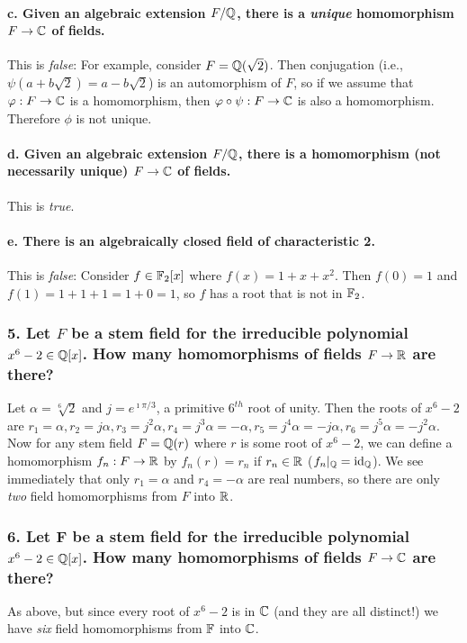 \paragraph*{c. Given an algebraic extension $F/\mathbb{Q}$, there is a \emph{unique} homomorphism $F \to \mathbb{C}$ of fields.}
This is \emph{false}: For example, consider $F = \mathbb{Q}(\sqrt{2})$. Then conjugation (i.e., $\psi(a + b \sqrt{2}) = a - b \sqrt{2}$) is an automorphism of $F$, so if we assume that $\varphi: F \to \mathbb{C}$ is a homomorphism, then $\varphi \circ \psi: F \to \mathbb{C}$ is also a homomorphism. Therefore $\phi$ is not unique.

\paragraph*{d. Given an algebraic extension $F/\mathbb{Q}$, there is a homomorphism (not necessarily unique) $F \to \mathbb{C}$ of fields.}
This is \emph{true}.

\paragraph*{e. There is an algebraically closed field of characteristic 2.}
This is \emph{false}: Consider $f \in \mathbb{F}_2[x]$ where $f(x) = 1 + x + x^2$. Then $f(0) = 1$ and $f(1) = 1 + 1 + 1 = 1 + 0 = 1$, so $f$ has a root that is not in $\mathbb{F}_2$.

\subsubsection*{5. Let $F$ be a stem field for the irreducible polynomial $x^6 - 2 \in \mathbb{Q}[x]$. How many homomorphisms of fields $F \to \mathbb{R}$ are there?}
Let $\alpha = \sqrt[6]{2}$ and $j = e^{\imath\pi / 3}$, a primitive $6^{th}$ root of unity. Then the roots of $x^6 - 2$ are $r_1 = \alpha, r_2 = j\alpha, r_3 = j^2\alpha, r_4 = j^3\alpha = -\alpha, r_5 = j^4\alpha = -j\alpha, r_6 = j^5\alpha = -j^2\alpha$. Now for any stem field $F = \mathbb{Q}(r)$ where $r$ is some root of $x^6 - 2$, we can define a homomorphism $f_n: F \to \mathbb{R}$ by $f_n(r) = r_n$ if $r_n \in \mathbb{R}$ ($f_n |_{\mathbb{Q}} = \mathrm{id}_{\mathbb{Q}}$). We see immediately that only $r_1 = \alpha$ and $r_4 = -\alpha$ are real numbers, so there are only \emph{two} field homomorphisms from $F$ into $\mathbb{R}$.

\subsubsection*{6. Let F be a stem field for the irreducible polynomial $x^6 - 2 \in \mathbb{Q}[x]$. How many homomorphisms of fields $F \to \mathbb{C}$ are there?}
As above, but since every root of $x^6 - 2$ is in $\mathbb{C}$ (and they are all distinct!) we have \emph{six} field homomorphisms from $\mathbb{F}$ into $\mathbb{C}$.
